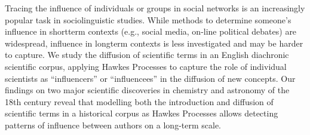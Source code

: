 Tracing the influence of individuals or groups in social networks is an increasingly popular task in sociolinguistic studies. While methods to determine someone's influence in shortterm contexts (e.g., social media, on-line political debates) are widespread, influence in longterm contexts is less investigated and may be harder to capture. We study the diffusion of scientific terms in an English diachronic scientific corpus, applying Hawkes Processes to capture the role of individual scientists as ``influencers'' or ``influencees'' in the diffusion of new concepts. Our findings on two major scientific discoveries in chemistry and astronomy of the 18th century reveal that modelling both the introduction and diffusion of scientific terms in a historical corpus as Hawkes Processes allows detecting patterns of influence between authors on a long-term scale.
